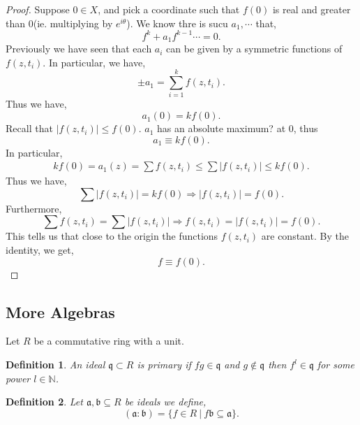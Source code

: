 \documentclass{article}
\newtheorem{definition}{Definition}[section]
\newcommand{\N}[0]{\mathbb{N}}
\newcommand{\sep}[0]{\:|\:}
\begin{document}
\begin{proof}
  Suppose $0\in X$, and pick a coordinate such that $f(0)$ is real and greater than $0$(ie. multiplying by $e^{i\theta}$).
  We know thre is sucu $a_1,\cdots $ that,
  \begin{equation*}
    f^k+a_1f^{k-1}\cdots = 0.
  \end{equation*}
  Previously we have seen that each $a_i$ can be given by a symmetric functions of $f(z,t_i)$. In particular, we have,
  \begin{equation*}
    \pm a_1 = \sum_{i=1}^k f(z,t_i).
  \end{equation*}
  Thus we have,
  \begin{equation*}
    a_1(0) = kf(0).
  \end{equation*}
  Recall that $\vert f(z,t_i)\vert \leq f(0)$. $a_1$ has an absolute maximum? at $0$, thus 
  \begin{equation*}
    a_1\equiv kf(0).
  \end{equation*}
  In particular,
  \begin{align*}
    kf(0) = a_1(z) = \sum f(z,t_i) \leq \sum\vert f(z,t_i)\vert \leq kf(0).
  \end{align*}
  Thus we have,
  \begin{equation*}
    \sum\vert f(z,t_i)\vert = kf(0) \Rightarrow \vert f(z,t_i)\vert = f(0).
  \end{equation*}
  Furthermore,
  \begin{equation*}
    \sum f(z,t_i) = \sum \vert f(z,t_i)\vert \Rightarrow f(z,t_i) = \vert f(z,t_i)\vert = f(0).
  \end{equation*}
  This tells us that close to the origin the functions $f(z,t_i)$ are constant. By the identity, we get,
  \begin{equation*}
    f \equiv f(0).
  \end{equation*}
\end{proof}

\subsection{More Algebras}

Let $R$ be a commutative ring with a unit.
\begin{definition}
  An ideal $\mathfrak{q}\subset R$ is primary if $fg\in\mathfrak{q}$ and $g\not\in\mathfrak{q}$ then $f^l\in\mathfrak{q}$ for some power $l\in\N$.
\end{definition}

\begin{definition}
  Let $\mathfrak{a},\mathfrak{b}\subseteq R$ be ideals we define,
  \begin{equation*}
    (\mathfrak{a}:\mathfrak{b}) = \{f\in R\sep f\mathfrak{b}\subseteq \mathfrak{a}\}.
  \end{equation*}
\end{definition}
\end{document}
